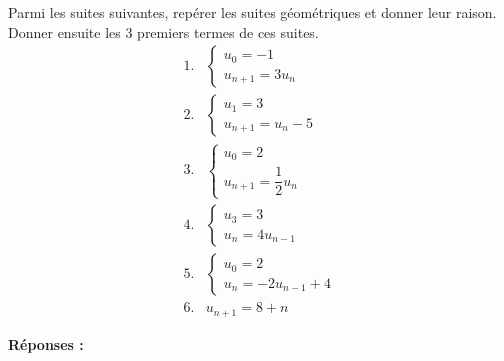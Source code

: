 \documentclass[a4paper,12pt]{article}
\begin{document}
      \begin{tcolorbox}[colback=gray!10, colframe=gray!50, title=Exercice \textbf{124} page 132]
        Parmi les suites suivantes, repérer les suites géométriques et donner leur raison. Donner ensuite les 3 premiers termes de ces suites.
        \[
        \begin{array}{ll}
        1. & \left\{
          \begin{array}{l}
          u_0 = -1 \\
          u_{n+1} = 3u_n
          \end{array}
          \right. \\
        2. & \left\{
          \begin{array}{l}
          u_1 = 3 \\
          u_{n+1} = u_n - 5
          \end{array}
          \right. \\
        3. & \left\{
          \begin{array}{l}
          u_0 = 2 \\
          u_{n+1} = \dfrac{1}{2} u_n
          \end{array}
          \right. \\
        4. & \left\{
          \begin{array}{l}
          u_3 = 3 \\
          u_n = 4u_{n-1}
          \end{array}
          \right. \\
        5. & \left\{
          \begin{array}{l}
          u_0 = 2 \\
          u_n = -2u_{n-1} + 4
          \end{array}
          \right. \\
        6. & u_{n+1} = 8 + n
        \end{array}
        \]
        \end{tcolorbox}
        
        \bigskip
        
        \textbf{Réponses :}
        
\end{document}
